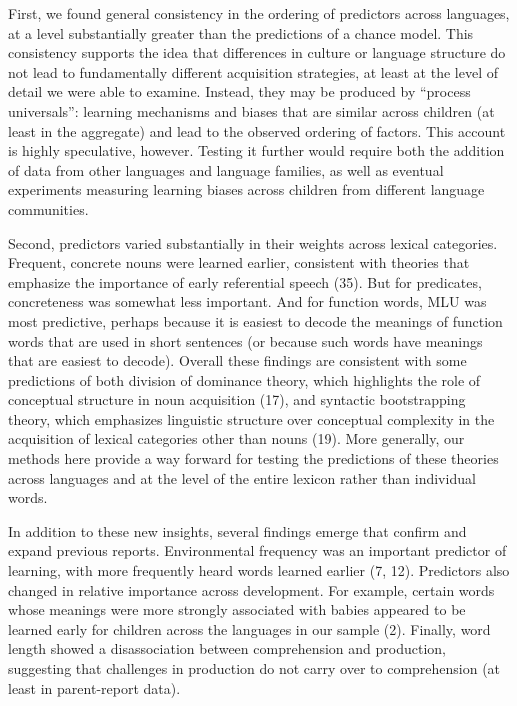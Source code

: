 \documentclass[english,man]{apa6}
\theoremstyle{definition}
\theoremstyle{definition}
\theoremstyle{definition}
\theoremstyle{remark}
\begin{document}
First, we found general consistency in the ordering of predictors across
languages, at a level substantially greater than the predictions of a
chance model. This consistency supports the idea that differences in
culture or language structure do not lead to fundamentally different
acquisition strategies, at least at the level of detail we were able to
examine. Instead, they may be produced by \enquote{process universals}:
learning mechanisms and biases that are similar across children (at
least in the aggregate) and lead to the observed ordering of factors.
This account is highly speculative, however. Testing it further would
require both the addition of data from other languages and language
families, as well as eventual experiments measuring learning biases
across children from different language communities.

Second, predictors varied substantially in their weights across lexical
categories. Frequent, concrete nouns were learned earlier, consistent
with theories that emphasize the importance of early referential speech
(35). But for predicates, concreteness was somewhat less important. And
for function words, MLU was most predictive, perhaps because it is
easiest to decode the meanings of function words that are used in short
sentences (or because such words have meanings that are easiest to
decode). Overall these findings are consistent with some predictions of
both division of dominance theory, which highlights the role of
conceptual structure in noun acquisition (17), and syntactic
bootstrapping theory, which emphasizes linguistic structure over
conceptual complexity in the acquisition of lexical categories other
than nouns (19). More generally, our methods here provide a way forward
for testing the predictions of these theories across languages and at
the level of the entire lexicon rather than individual words.

In addition to these new insights, several findings emerge that confirm
and expand previous reports. Environmental frequency was an important
predictor of learning, with more frequently heard words learned earlier
(7, 12). Predictors also changed in relative importance across
development. For example, certain words whose meanings were more
strongly associated with babies appeared to be learned early for
children across the languages in our sample (2). Finally, word length
showed a disassociation between comprehension and production, suggesting
that challenges in production do not carry over to comprehension (at
least in parent-report data).
\end{document}
